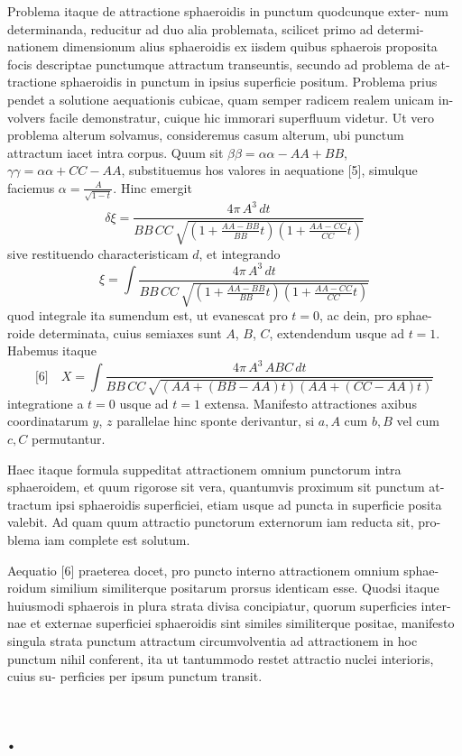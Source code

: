 \documentclass[12pt,a4paper]{article}
\theoremstyle{gauss}
\begin{document}
Problema itaque de attractione sphaeroidis in punctum quodcunque exter-
num determinanda, reducitur ad duo alia problemata, scilicet primo ad determi-
nationem dimensionum alius sphaeroidis ex iisdem quibus sphaerois proposita
focis descriptae punctumque attractum transeuntis, secundo ad problema de at-
tractione sphaeroidis in punctum in ipsius superficie positum. Problema prius
pendet a solutione aequationis cubicae, quam semper radicem realem unicam in-
volvers facile demonstratur, cuique hic immorari superfluum videtur. Ut vero
problema alterum solvamus, consideremus casum alterum, ubi punctum attractum
iacet intra corpus. Quum sit $\beta\beta = \alpha\alpha - AA + BB$, $\gamma\gamma = \alpha\alpha + CC - AA$,
substituemus hos valores in aequatione [5], simulque faciemus $\alpha = \frac{A}{\sqrt{1-t}}$. Hinc
emergit
\[
\delta\xi = \frac{4\pi\,A^3\,dt}{BB\,CC\,\sqrt{(1+\frac{AA-BB}{BB}t)(1+\frac{AA-CC}{CC}t)}}
\]
sive restituendo characteristicam $d$, et integrando
\[
\xi = \int\frac{4\pi\,A^3\,dt}{BB\,CC\,\sqrt{(1+\frac{AA-BB}{BB}t)(1+\frac{AA-CC}{CC}t)}}
\]
quod integrale ita sumendum est, ut evanescat pro $t=0$, ac dein, pro sphae-
roide determinata, cuius semiaxes sunt $A$, $B$, $C$, extendendum usque ad $t=1$.
Habemus itaque
\[
\text{[6]}\quad X = \int\frac{4\pi\,A^3\,ABC\,dt}{BB\,CC\,\sqrt{(AA+(BB-AA)t)(AA+(CC-AA)t)}}
\]
integratione a $t=0$ usque ad $t=1$ extensa. Manifesto attractiones axibus
coordinatarum $y$, $z$ parallelae hinc sponte derivantur, si $a,A$ cum $b,B$ vel
cum $c,C$ permutantur.

Haec itaque formula suppeditat attractionem omnium punctorum intra
sphaeroidem, et quum rigorose sit vera, quantumvis proximum sit punctum at-
tractum ipsi sphaeroidis superficiei, etiam usque ad puncta in superficie posita
valebit. Ad quam quum attractio punctorum externorum iam reducta sit, pro-
blema iam complete est solutum.

Aequatio [6] praeterea docet, pro puncto interno attractionem omnium sphae-
roidum similium similiterque positarum prorsus identicam esse. Quodsi itaque
huiusmodi sphaerois in plura strata divisa concipiatur, quorum superficies inter-
nae et externae superficiei sphaeroidis sint similes similiterque positae, manifesto
singula strata punctum attractum circumvolventia ad attractionem in hoc punctum
nihil conferent, ita ut tantummodo restet attractio nuclei interioris, cuius su-
perficies per ipsum punctum transit.

\newpage
\setcounter{page}{27}

\section*{%
%
\thesection.}
\end{document}
